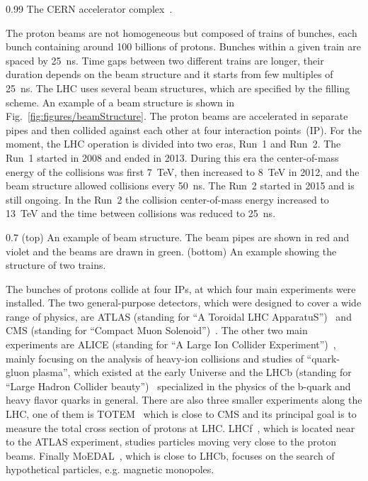                  {0.99}       %
                 { The CERN accelerator complex~\cite{Mobs:2225847}. }

The proton beams are not homogeneous but composed of trains of bunches, each bunch containing around 100 billions of protons. Bunches within a given train are spaced by 25~ns. Time gaps between two different trains are longer, their duration depends on the beam structure and it starts from few multiples of 25~ns. The LHC uses several beam structures, which are specified by the filling scheme. An example of a beam structure is shown in Fig.~\ref{fig:figures/beamStructure}. The proton beams are accelerated in separate pipes and then collided against each other at four interaction points~(IP). For the moment, the LHC operation is divided into two eras, Run~1 and Run~2. The Run~1 started in 2008 and ended in 2013. During this era the center-of-mass energy of the collisions was first 7~TeV, then increased to 8~TeV in 2012, and the beam structure allowed collisions every 50~ns. The Run~2 started in 2015 and is still ongoing. In the Run~2 the collision center-of-mass energy increased to 13~TeV and the time between collisions was reduced to 25~ns.

                 {0.7}       %
                 { (top) An example of beam structure. The beam pipes are shown in red and violet and the beams are drawn in green. (bottom) An example showing the structure of two trains. }

The bunches of protons collide at four IPs, at which four main experiments were installed. The two general-purpose detectors, which were designed to cover a wide range of physics, are ATLAS (standing for ``A Toroidal  LHC ApparatuS'')~\cite{Aad:2008zzm} and CMS (standing for ``Compact Muon Solenoid'')~\cite{Chatrchyan:2008aa}. The other two main experiments are ALICE (standing for ``A Large Ion Collider Experiment'')~\cite{Aamodt:2008zz}, mainly focusing on the analysis of heavy-ion collisions and studies of ``quark-gluon plasma'', which existed at the early Universe and the LHCb (standing for ``Large Hadron Collider beauty'')~\cite{Alves:2008zz} specialized in the physics of the b-quark and heavy flavor quarks in general. There are also three smaller experiments along the LHC, one of them is TOTEM~\cite{Anelli:2008zza} which is close to CMS and its principal goal is to measure the total cross section of protons at LHC. LHCf~\cite{Adriani:2008zz}, which is located near to the ATLAS experiment, studies particles moving very close to the proton beams. Finally MoEDAL~\cite{Acharya:2014nyr}, which is close to LHCb, focuses on the search of hypothetical particles, e.g. magnetic monopoles.

